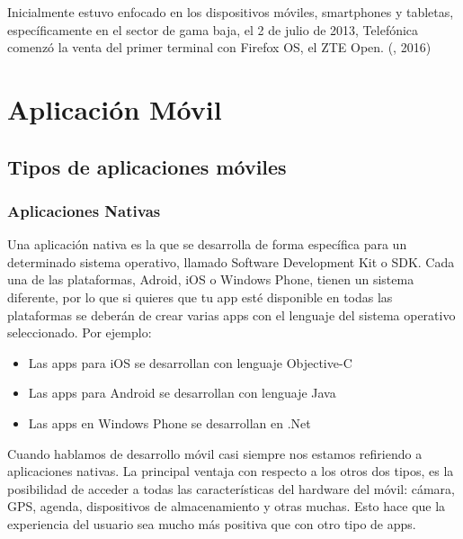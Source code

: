 Inicialmente estuvo enfocado en los dispositivos móviles, smartphones y tabletas, específicamente en el sector de gama baja, el 2 de julio de 2013, Telefónica comenzó la venta del primer terminal con Firefox OS, el ZTE Open.
\setlength{\parskip}{0mm}
(\citet{firefoxbib}, 2016)




\section{Aplicación Móvil}	

\subsection{Tipos de aplicaciones móviles}

\subsubsection{Aplicaciones Nativas}
\setlength{\parskip}{5mm}
Una aplicación nativa es la que se desarrolla de forma específica para un determinado  sistema operativo, llamado Software Development Kit o SDK. Cada una de las plataformas, Adroid, iOS o Windows Phone, tienen un sistema diferente, por lo que si quieres que tu app esté disponible en todas las plataformas se deberán de crear varias apps con el lenguaje del sistema operativo seleccionado.
Por ejemplo:
\setlength{\parskip}{0mm}
\begin{itemize}

	\item Las apps para iOS se desarrollan con lenguaje Objective-C
	
	\item Las apps para Android se desarrollan con lenguaje Java
	
	\item Las apps en Windows Phone se desarrollan en .Net

	
\end{itemize}
\setlength{\parskip}{5mm}
Cuando hablamos de desarrollo móvil casi siempre nos estamos refiriendo a aplicaciones nativas. La principal ventaja con respecto a los otros dos tipos, es la posibilidad de acceder a todas las características del hardware del móvil: cámara, GPS, agenda, dispositivos de almacenamiento y otras muchas. Esto hace que la experiencia del usuario sea mucho más positiva que con otro tipo de apps.

